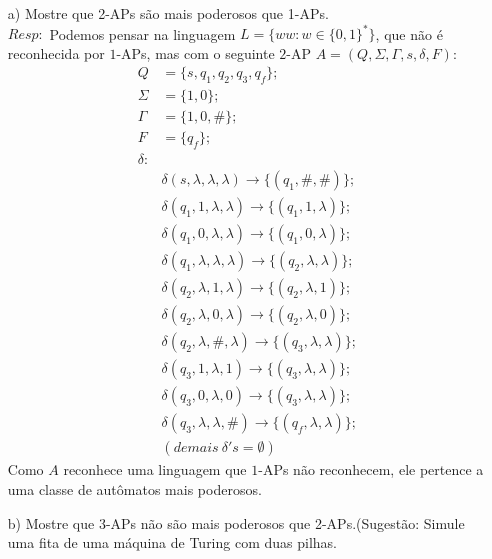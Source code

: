 \documentclass{homework}
\begin{document}
	\begin{enumerate}
		\item[a)] Mostre que 2-APs são mais poderosos que 1-APs.\\
		$Resp:$ Podemos pensar na linguagem $L = \{ww: w \in \{0,1\}^*\}$, que não é reconhecida por $1$-APs, mas com o seguinte $2$-AP $A = (Q,\Sigma,\Gamma,s,\delta,F)$:\\
		\begin{align*}
			Q & = \{s,q_1,q_2,q_3,q_f\};\\
			\Sigma & = \{1,0\};\\
			\Gamma & = \{1,0,\#\};\\
			F & = \{q_f\};\\
			\delta : \\
			&\delta(s, \lambda, \lambda, \lambda) \rightarrow \{(q_1,\#,\#)\};\\
			&\delta(q_1, 1, \lambda, \lambda) \rightarrow \{(q_1,1,\lambda)\};\\
			&\delta(q_1, 0, \lambda, \lambda) \rightarrow \{(q_1,0,\lambda)\};\\
			&\delta(q_1, \lambda, \lambda, \lambda) \rightarrow \{(q_2,\lambda,\lambda)\};\\
			&\delta(q_2, \lambda, 1, \lambda) \rightarrow \{(q_2,\lambda,1)\};\\
			&\delta(q_2, \lambda, 0, \lambda) \rightarrow \{(q_2,\lambda,0)\};\\
			&\delta(q_2, \lambda, \#,\lambda) \rightarrow \{(q_3,\lambda,\lambda)\};\\
			&\delta(q_3, 1, \lambda, 1) \rightarrow \{(q_3,\lambda,\lambda)\};\\
			&\delta(q_3, 0, \lambda, 0) \rightarrow \{(q_3,\lambda,\lambda)\};\\
			&\delta(q_3, \lambda, \lambda, \#) \rightarrow \{(q_f,\lambda,\lambda)\};\\
			&(demais\ \delta 's = \emptyset)
		\end{align*}
		Como $A$ reconhece uma linguagem que $1$-APs não reconhecem, ele pertence a uma classe de autômatos mais poderosos.				
		\item[b)] Mostre que 3-APs não são mais poderosos que 2-APs.(Sugestão: Simule uma fita de uma máquina de Turing com duas pilhas.
	\end{enumerate}
\end{document}
